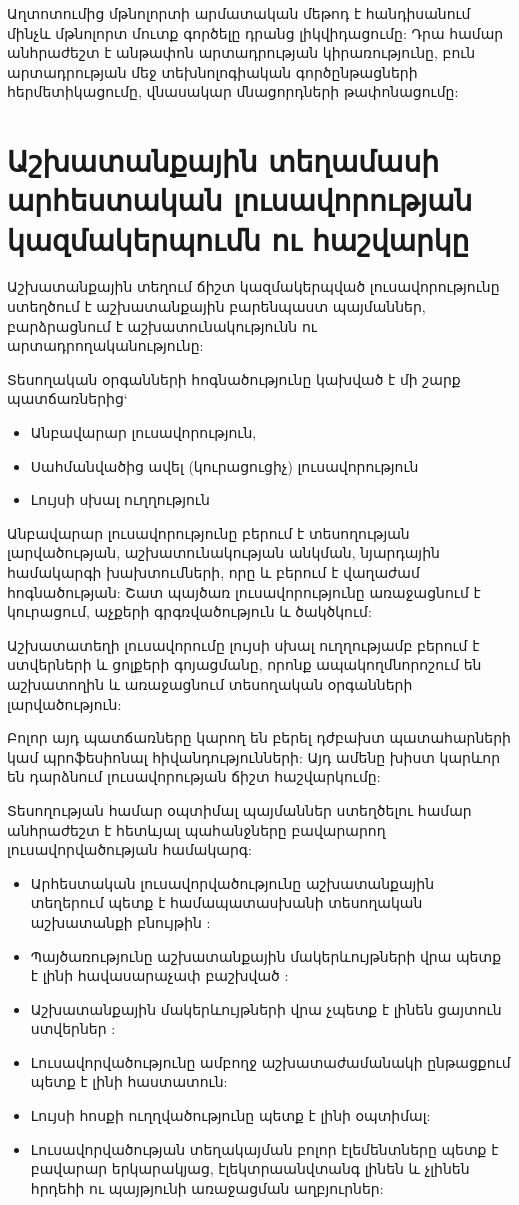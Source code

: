\documentclass[12pt]{article}
\begin{document}
\begin{sloppypar}
Աղտոտումից մթնոլորտի արմատական մեթոդ է հանդիսանում մինչև մթնոլորտ մուտք գործելը դրանց լիկվիդացումը: Դրա համար անհրաժեշտ է անթափոն արտադրության կիրառությունը, բուն արտադրության մեջ տեխնոլոգիական գործընթացների հերմետիկացումը, վնասակար մնացորդների թափոնացումը:



\newpage
\setcounter{page}{52}
\section*{Աշխատանքային տեղամասի արհեստական լուսավորության կազմակերպումն ու հաշվարկը}

Աշխատանքային տեղում ճիշտ կազմակերպված լուսավորությունը ստեղծում է աշխատանքային բարենպաստ պայմաններ, բարձրացնում է աշխատունակությունն ու արտադրողականությունը:

Տեսողական օրգանների հոգնածությունը կախված է մի շարք պատճառներից`
\begin{itemize}
\item Անբավարար լուսավորություն,
\item Սահմանվածից ավել (կուրացուցիչ) լուսավորություն
\item Լույսի սխալ ուղղություն
\end{itemize}

Անբավարար լուսավորությունը բերում է տեսողության լարվածության, աշխատունակության անկման, նյարդային համակարգի խախտումների, որը և բերում է վաղաժամ հոգնածության:  Շատ պայծառ լուսավորությունը առաջացնում է կուրացում, աչքերի գրգռվածություն և ծակծկում:

Աշխատատեղի լուսավորումը լույսի սխալ ուղղությամբ բերում է ստվերների և ցոլքերի գոյացմանը, որոնք ապակողմնորոշում են աշխատողին և առաջացնում տեսողական օրգանների լարվածություն:

Բոլոր այդ պատճառները կարող են բերել դժբախտ պատահարների կամ պրոֆեսիոնալ հիվանդությունների: Այդ ամենը խիստ կարևոր են դարձնում լուսավորության ճիշտ հաշվարկումը:

Տեսողության համար օպտիմալ պայմաններ ստեղծելու համար անհրաժեշտ է հետևյալ պահանջները բավարարող լուսավորվածության համակարգ:
\begin{itemize}
\item Արհեստական լուսավորվածությունը աշխատանքային տեղերում պետք է համապատասխանի տեսողական աշխատանքի բնույթին :
\item Պայծառությունը աշխատանքային մակերևույթների վրա պետք է լինի հավասարաչափ բաշխված :
\item Աշխատանքային մակերևույթների վրա չպետք է լինեն ցայտուն ստվերներ :
\item Լուսավորվածությունը ամբողջ աշխատաժամանակի ընթացքում պետք է լինի հաստատուն:
\item Լույսի հոսքի ուղղվածությունը պետք է լինի օպտիմալ:
\item Լուսավորվածության տեղակայման բոլոր էլեմենտները պետք է բավարար երկարակյաց, էլեկտրաանվտանգ լինեն և չլինեն հրդեհի ու պայթյունի առաջացման աղբյուրներ: 
\end{itemize}


\end{sloppypar}
\end{document}
